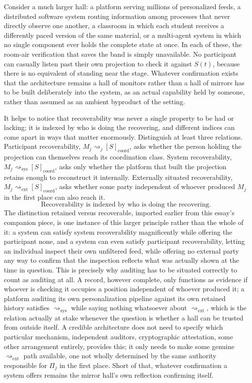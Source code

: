 \documentclass[12pt]{article}
\begin{document}
Consider a much larger hall: a platform serving millions of personalized feeds, a distributed software system routing information among processes that never directly observe one another, a classroom in which each student receives a differently paced version of the same material, or a multi-agent system in which no single component ever holds the complete state at once. In each of these, the room-air verification that saves the band is simply unavailable. No participant can casually listen past their own projection to check it against $S(t)$, because there is no equivalent of standing near the stage. Whatever confirmation exists that the architecture remains a hall of monitors rather than a hall of mirrors has to be built deliberately into the system, as an actual capability held by someone, rather than assumed as an ambient byproduct of the setting.

It helps to notice that recoverability was never a single property to be had or lacking; it is indexed by who is doing the recovering, and different indices can come apart in ways that matter enormously. Distinguish at least three relations. Participant recoverability, $M_j \rightsquigarrow_j [S]_{\mathrm{coord}}$, asks whether the person holding the projection can themselves reach its coordination class. System recoverability, $M_j \rightsquigarrow_{\mathrm{sys}} [S]_{\mathrm{coord}}$, asks only whether the platform that built the projection retains enough to reconstruct it internally. Externally situated recoverability, $M_j \rightsquigarrow_{\mathrm{ext}} [S]_{\mathrm{coord}}$, asks whether some party independent of whoever produced $M_j$ in the first place can also reach it.
\[
\boxed{\text{Recoverability is indexed by who is doing the recovering.}}
\]
The distinction retained versus recoverable, imported earlier from this essay's companion piece, is one instance of this larger principle rather than the whole of it: a system can satisfy system recoverability magnificently while offering the participant none, and a system can even satisfy participant recoverability, letting an individual inspect their own unfiltered feed, while offering no external party any way to confirm that the inspection reflects what was actually shown at the time in question. This is precisely why auditing has to be situated correctly to count as auditing at all. A record, however complete, only functions as evidence if whoever is checking it occupies a position independent of whoever produced it; a platform auditing its own personalization pipeline against its own retained history satisfies $\rightsquigarrow_{\mathrm{sys}}$ while saying nothing whatsoever about $\rightsquigarrow_{\mathrm{ext}}$, which is the relation actually at stake whenever the question is whether a hall can be trusted from outside itself. A credible architecture does not need to specify which particular mechanism, independent auditors, cryptographic attestation, some other arrangement entirely, provides this; it only needs to make some genuine $\rightsquigarrow_{\mathrm{ext}}$ path available, one not wholly determined by the same authority responsible for $\Pi_j$ in the first place. Short of that, whatever confirmation a system offers remains the mirror hall's own reflection confirming itself.
\end{document}
